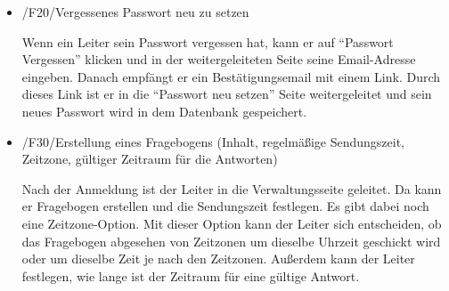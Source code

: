 \documentclass[a4paper]{scrreprt}
\begin{document}
\begin{itemize}
	            \item /F20/Vergessenes Passwort neu zu setzen
	            	\par Wenn ein Leiter sein Passwort vergessen hat, kann er auf “Passwort Vergessen” klicken und in der weitergeleiteten Seite seine Email-Adresse eingeben. Danach empfängt er ein Bestätigungsemail mit einem Link. Durch dieses Link ist er in die “Passwort neu setzen” Seite weitergeleitet und sein neues Passwort wird in dem Datenbank gespeichert.

	            \item /F30/Erstellung eines Fragebogens (Inhalt, regelmäßige Sendungszeit, Zeitzone, gültiger Zeitraum für die Antworten)
	            	\par Nach der Anmeldung ist der Leiter in die Verwaltungsseite geleitet. Da kann er Fragebogen erstellen und die Sendungszeit festlegen. Es gibt dabei noch eine Zeitzone-Option. Mit dieser Option kann der Leiter sich entscheiden, ob das Fragebogen abgesehen von Zeitzonen um dieselbe Uhrzeit geschickt wird oder um dieselbe Zeit je nach den Zeitzonen. Außerdem kann der Leiter festlegen, wie lange ist der Zeitraum für eine gültige Antwort.
	            

\end{itemize}
\end{document}
